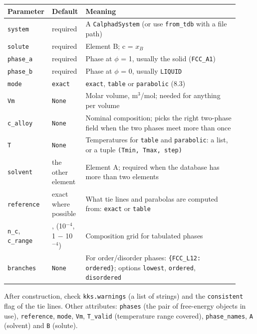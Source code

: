 \documentclass[12pt,a4paper]{article}
\begin{document}
\begin{longtable}{>{\raggedright\arraybackslash}p{0.134\linewidth}>{\raggedright\arraybackslash}p{0.136\linewidth}>{\raggedright\arraybackslash}p{0.650\linewidth}}
\toprule
\textbf{Parameter} & \textbf{Default} & \textbf{Meaning} \\
\midrule
\endhead
\texttt{system} & required & A \texttt{CalphadSystem} (or use \texttt{from\_\allowbreak{}tdb} with a file path) \\
\texttt{solute} & required & Element B; c = \(x_{B}\) \\
\texttt{phase\_\allowbreak{}a} & required & Phase at \(\phi\) = 1, usually the solid (\texttt{\textquotedbl{}FCC\_\allowbreak{}A1\textquotedbl{}}) \\
\texttt{phase\_\allowbreak{}b} & required & Phase at \(\phi\) = 0, usually \texttt{\textquotedbl{}LIQUID\textquotedbl{}} \\
\texttt{mode} & \texttt{\textquotedbl{}exact\textquotedbl{}} & \texttt{\textquotedbl{}exact\textquotedbl{}}, \texttt{\textquotedbl{}table\textquotedbl{}} or \texttt{\textquotedbl{}parabolic\textquotedbl{}} (8.3) \\
\texttt{Vm} & \texttt{None} & Molar volume, m\(^{3}\)/mol; needed for anything per volume \\
\texttt{c\_\allowbreak{}alloy} & \texttt{None} & Nominal composition; picks the right two-phase field when the two phases meet more than once \\
\texttt{T} & \texttt{None} & Temperatures for \texttt{table} and \texttt{parabolic}: a list, or a tuple \texttt{(Tmin,\allowbreak{} Tmax,\allowbreak{} step)} \\
\texttt{solvent} & the other element & Element A; required when the database has more than two elements \\
\texttt{reference} & exact where possible & What tie lines and parabolas are computed from: \texttt{\textquotedbl{}exact\textquotedbl{}} or \texttt{\textquotedbl{}table\textquotedbl{}} \\
\texttt{n\_\allowbreak{}c}, \texttt{c\_\allowbreak{}range} & 201, (10\(^{-4}\), 1 \(-\) 10\(^{-4}\)) & Composition grid for tabulated phases \\
\texttt{branches} & \texttt{None} & For order/disorder phases: \texttt{\{\textquotedbl{}FCC\_\allowbreak{}L12\textquotedbl{}: \textquotedbl{}ordered\textquotedbl{}\}}; options \texttt{\textquotedbl{}lowest\textquotedbl{}}, \texttt{\textquotedbl{}ordered\textquotedbl{}}, \texttt{\textquotedbl{}disordered\textquotedbl{}} \\
\bottomrule
\end{longtable}
\endgroup
After construction, check \texttt{kks.\allowbreak{}warnings} (a list of strings) and the \texttt{consistent} flag of the tie lines. Other attributes: \texttt{phases} (the pair of free-energy objects in use), \texttt{reference}, \texttt{mode}, \texttt{Vm}, \texttt{T\_\allowbreak{}valid} (temperature range covered), \texttt{phase\_\allowbreak{}names}, \texttt{A} (solvent) and \texttt{B} (solute).
\end{document}

